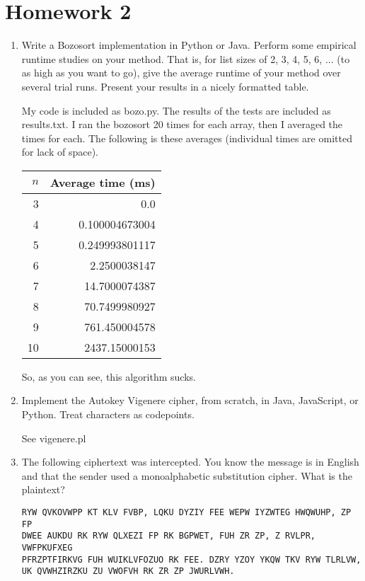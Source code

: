 \documentclass[a4paper,12pt]{article}
\begin{document}
\section*{Homework 2}

\begin{enumerate}

\item Write a Bozosort implementation in Python or Java. Perform some empirical runtime studies on your method. That is, for list sizes of 2, 3, 4, 5, 6, ... (to as high as you want to go), give the average runtime of your method over several trial runs. Present your results in a nicely formatted table.

My code is included as bozo.py. The results of the tests are included as results.txt. I ran the bozosort 20 times for each array, then I averaged the times for each. The following is these averages (individual times are omitted for lack of space).

\begin{center}
\begin{tabular}{|r|r|}
\hline
$n$ & Average time (ms)\\\hline
3 & 0.0\\\hline
4 & 0.100004673004\\\hline
5 & 0.249993801117\\\hline
6 & 2.2500038147\\\hline
7 & 14.7000074387\\\hline
8 & 70.7499980927\\\hline
9 & 761.450004578\\\hline
10 & 2437.15000153\\\hline
\end{tabular}
\end{center}

So, as you can see, this algorithm sucks.

\item Implement the Autokey Vigenere cipher, from scratch, in Java, JavaScript, or Python. Treat characters as codepoints.

See vigenere.pl

\item The following ciphertext was intercepted. You know the message is in English and that the sender used a monoalphabetic substitution cipher. What is the plaintext?

\begin{verbatim}
RYW QVKOVWPP KT KLV FVBP, LQKU DYZIY FEE WEPW IYZWTEG HWQWUHP, ZP FP
DWEE AUKDU RK RYW QLXEZI FP RK BGPWET, FUH ZR ZP, Z RVLPR, VWFPKUFXEG
PFRZPTFIRKVG FUH WUIKLVFOZUO RK FEE. DZRY YZOY YKQW TKV RYW TLRLVW,
UK QVWHZIRZKU ZU VWOFVH RK ZR ZP JWURLVWH.
\end{verbatim}


\end{enumerate}
\end{document}
